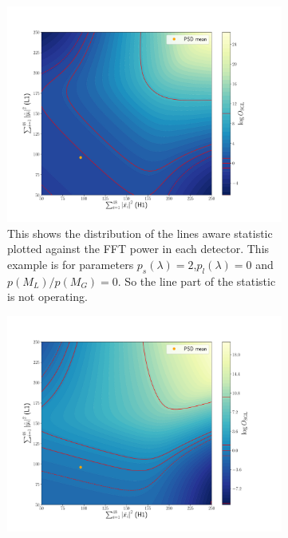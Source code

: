\begin{figure}
\centering

\begin{subfigure}[h]{\linewidth}
\begin{minipage}{0.65\linewidth}
\includegraphics[width=0.9\linewidth]{C3_soap/lookup_3d_2.pdf}
\end{minipage}\hfill
\begin{minipage}{0.35\linewidth}
\caption{This shows the distribution of the lines aware statistic plotted against the \gls{FFT} power in each detector. This example is for parameters $p_s(\lambda) = 2$,$p_l(\lambda) = 0$ and $p(M_L)/p(M_G) = 0$. So the line part of the statistic is not operating.}
\label{soap:lineawareamp:plot:noline}
\end{minipage}
\end{subfigure}
\begin{subfigure}[h]{\linewidth}
\begin{minipage}{0.65\linewidth}
\includegraphics[width=0.9\columnwidth]{C3_soap/lookup_3d_1.pdf}

\end{minipage}
\end{subfigure}
\end{figure}
